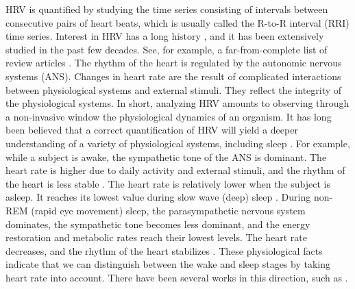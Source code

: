 \documentclass[10pt,a4paper,english]{amsart}
\begin{document}
HRV is quantified by studying the time series consisting of intervals between consecutive pairs of heart beats, which is usually called the R-to-R interval (RRI) time series. 
Interest in HRV has a long history \cite{Billman2011}, and it has been extensively studied in the past few decades. See, for example, a far-from-complete list of review articles \cite{Vanderlei_Pastre_Hoshi_Carvalho_Godoy:2009,Shaffer2014}. 
The rhythm of the heart is regulated by the autonomic nervous systems (ANS). Changes in heart rate are the result of complicated interactions between physiological systems and external stimuli.  They reflect the integrity of the physiological systems. In short, analyzing HRV amounts to observing through a non-invasive window the physiological dynamics of an organism. 
%
%
It has long been believed that a correct quantification of HRV will yield a deeper understanding of a variety of physiological systems, including sleep \cite{Snyder:1964,Zemaityte1984,Somers:1993,Vaughn1995,Toscani1996,Bonnet1997,SigridElsenbruchMichaelJHarnish1999,Chouchou2014,Penzel2016}. For example, while a subject is awake, the sympathetic tone of the ANS is dominant. The heart rate is higher due to daily activity and external stimuli, and the rhythm of the heart is less stable \cite{Somers:1993}.   
%
The heart rate is relatively lower when the subject is asleep. It reaches its lowest value during slow wave (deep) sleep \cite{Snyder:1964}. During non-REM (rapid eye movement) sleep, the parasympathetic nervous system dominates, the sympathetic tone becomes less dominant, and the energy restoration and metabolic rates reach their lowest levels. The heart rate decreases, and the rhythm of the heart stabilizes \cite{Somers:1993}. These physiological facts indicate that we can distinguish between the wake and sleep stages by taking heart rate into account. There have been several works in this direction, such as \cite{Lewicke2008,Mendez2010,Long2012,Xiao2013,Aktaruzzaman2015,Ye2016,Vicente2016}.   
\end{document}
